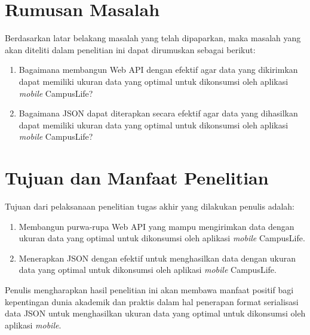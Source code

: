 \documentclass[a4paper, 12pt, oneside]{report}
\begin{document}
\section{Rumusan Masalah}
\onehalfspacing Berdasarkan latar belakang masalah yang telah dipaparkan, maka masalah yang akan diteliti dalam penelitian ini dapat dirumuskan sebagai berikut:
\begin{enumerate}
  \item Bagaimana membangun Web API dengan efektif agar data yang dikirimkan dapat memiliki ukuran data yang optimal untuk dikonsumsi oleh aplikasi \textit{mobile} CampusLife?
  \item Bagaimana JSON dapat diterapkan secara efektif agar data yang dihasilkan dapat memiliki ukuran data yang optimal untuk dikonsumsi oleh aplikasi \textit{mobile} CampusLife?
\end{enumerate}

\section{Tujuan dan Manfaat Penelitian}
\onehalfspacing Tujuan dari pelaksanaan penelitian tugas akhir yang dilakukan penulis adalah:
\begin{enumerate}
  \item Membangun purwa-rupa Web API yang mampu mengirimkan data dengan ukuran data yang optimal untuk dikonsumsi oleh aplikasi \textit{mobile} CampusLife.
  \item Menerapkan JSON dengan efektif untuk menghasilkan data dengan ukuran data yang optimal untuk dikonsumsi oleh aplikasi \textit{mobile} CampusLife.
\end{enumerate}

\onehalfspacing Penulis mengharapkan hasil penelitian ini akan membawa manfaat positif bagi kepentingan dunia akademik dan praktis dalam hal penerapan format serialisasi data JSON untuk menghasilkan ukuran data yang optimal untuk dikonsumsi oleh aplikasi \textit{mobile}.
\end{document}

